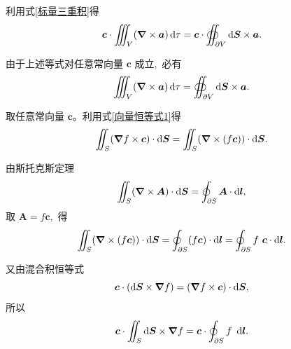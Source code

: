 利用式\ref{标量三重积}得
\[
\boldsymbol c\cdot
\iiint_V (\boldsymbol\nabla\times\boldsymbol a)\dif\tau
=
\boldsymbol c\cdot
\oiint_{\partial V} \dif \boldsymbol S\times\boldsymbol a.
\]

由于上述等式对任意常向量 $\boldsymbol c$ 成立, \,必有
\[
\iiint_V (\boldsymbol{\boldsymbol\nabla}\times\boldsymbol a)\dif\tau
=
\oiint_{\partial V} \dif \boldsymbol S\times\boldsymbol a.
\]


取任意常向量 $\boldsymbol c$。利用式\ref{向量恒等式1}得
\[
\iint_S (\boldsymbol{\nabla} f \times \boldsymbol c)\cdot \dif \boldsymbol S
=
\iint_S (\boldsymbol{\nabla} \times (f \boldsymbol c)) \cdot \dif \boldsymbol S.
\]

由斯托克斯定理
\[
\iint_S (\boldsymbol{\nabla}\times \boldsymbol A) \cdot \dif \boldsymbol S
=
\oint_{\partial S} \boldsymbol A \cdot \dif \boldsymbol l,
\]
取 $\boldsymbol A = f \boldsymbol c$, \,得
\[
\iint_S (\boldsymbol{\nabla} \times (f \boldsymbol c)) \cdot \dif \boldsymbol S
=
\oint_{\partial S} (f \boldsymbol c) \cdot \dif \boldsymbol l
=
\oint_{\partial S} f\, \,\boldsymbol c \cdot \dif \boldsymbol l.
\]

又由混合积恒等式
\[
\boldsymbol c \cdot (\dif \boldsymbol S \times \boldsymbol{\nabla} f)
=
(\boldsymbol{\nabla} f \times \boldsymbol c)\cdot \dif \boldsymbol S,
\]
所以
\[
\boldsymbol c \cdot 
\iint_S \dif \boldsymbol S \times \boldsymbol{\nabla} f
=
\boldsymbol c \cdot \oint_{\partial S} f\, \,\dif \boldsymbol l.
\]

